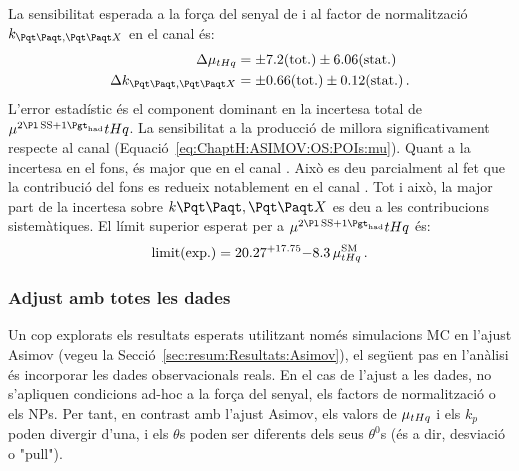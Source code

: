 La sensibilitat esperada a la força del senyal de \tHq i al factor de normalització $k_{\ttbar, \ttX}$ en el canal \dilepSStau és:
\begin{align}
\Delta \mu_{\tHq} &= \pm 7.2 (\text{tot.}) \pm 6.06 (\text{stat.}) \label{eq:resum:Fit:ASIMOV:SS:mu} \\
\Delta k_{\ttbar, \ttX} &= \pm 0.66 (\text{tot.}) \pm 0.12 (\text{stat.}) \label{eq:resum:Fit:ASIMOV:SS:k} \, .
\end{align}
L'error estadístic és el component dominant en la incertesa total de $\mu^{\dilepSStau}{\tHq}$. La sensibilitat a la producció de \tHq millora significativament respecte al canal \dilepOStau (Equació~\ref{eq:ChaptH:ASIMOV:OS:POIs:mu}). Quant a la incertesa en el fons, és major que en el canal \dilepOStau. Això es deu parcialment al fet que la contribució del fons es redueix notablement en el canal \dilepSStau. Tot i això, la major part de la incertesa sobre $k{\ttbar, \ttX}$ es deu a les contribucions sistemàtiques. 
El límit superior esperat per a $\mu^{\dilepSStau}{\tHq}$ és:
\begin{equation*}
\text{limit(exp.)} = 20.27^{+17.75}{-8.3} \, \mu^{\text{SM}}_{tHq}\, .
\end{equation*}



\subsubsection{Adjust amb totes les dades}
\label{sec:resum:Resultats:FullFit}

Un cop explorats els resultats esperats utilitzant només simulacions MC en l'ajust Asimov (vegeu la Secció~\ref{sec:resum:Resultats:Asimov}), 
el següent pas en l'anàlisi és incorporar les dades observacionals reals.
En el cas de l'ajust a les dades, no s'apliquen condicions ad-hoc a la força del senyal, els factors de normalització o els NPs. 
Per tant, en contrast amb l'ajust Asimov, els valors de $\mu_{tHq}$ i els $k_p$ poden divergir d'una, i els $\theta$s poden ser diferents dels seus $\theta^{0}$s (és a dir, desviació o "pull").


